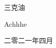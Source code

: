 

\acknowledgement
\begin{normalsize}

三克油


\hfill Achhhe

\hfill 二零二一年四月

\end{normalsize}









%
%
%
%				          				
%					
%

  \ifsmd
  \else
  \newpage
  \cleardoublepage
  \fi







